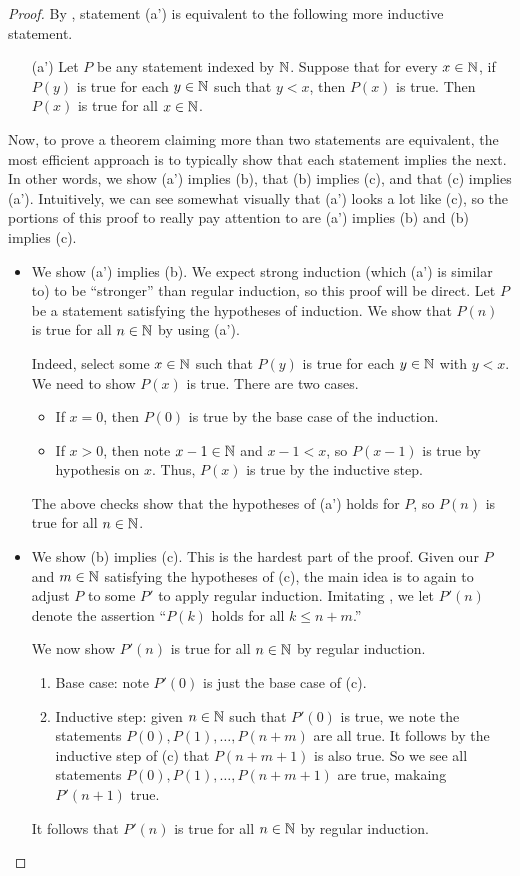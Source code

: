 \documentclass[../notes.tex]{subfiles}
\begin{document}
\begin{proof}
    By , statement (a') is equivalent to the following more inductive statement.
    \begin{itemize}
        \item[(a')] Let $P$ be any statement indexed by $\mathbb N$. Suppose that for every $x \in \mathbb N$, if $P(y)$ is true for each $y \in \mathbb N$ such that $y < x$, then $P(x)$ is true. Then $P(x)$ is true for all $x \in \mathbb N$.
    \end{itemize}
    Now, to prove a theorem claiming more than two statements are equivalent, the most efficient approach is to typically show that each statement implies the next. In other words, we show (a') implies (b), that (b) implies (c), and that (c) implies (a'). Intuitively, we can see somewhat visually that (a') looks a lot like (c), so the portions of this proof to really pay attention to are (a') implies (b) and (b) implies (c).
    \begin{itemize}
        \item We show (a') implies (b). We expect strong induction (which (a') is similar to) to be ``stronger'' than regular induction, so this proof will be direct. Let $P$ be a statement satisfying the hypotheses of induction. We show that $P(n)$ is true for all $n\in\mathbb N$ by using (a').

        Indeed, select some $x\in\mathbb N$ such that $P(y)$ is true for each $y\in\mathbb N$ with $y<x$. We need to show $P(x)$ is true. There are two cases.
        \begin{itemize}
            \item If $x=0$, then $P(0)$ is true by the base case of the induction.
            \item If $x>0$, then note $x-1\in\mathbb N$ and $x-1<x$, so $P(x-1)$ is true by hypothesis on $x$. Thus, $P(x)$ is true by the inductive step.
        \end{itemize}
        The above checks show that the hypotheses of (a') holds for $P$, so $P(n)$ is true for all $n\in\mathbb N$.
        
        \item We show (b) implies (c). This is the hardest part of the proof. Given our $P$ and $m\in\mathbb N$ satisfying the hypotheses of (c), the main idea is to again to adjust $P$ to some $P'$ to apply regular induction. Imitating , we let $P'(n)$ denote the assertion ``$P(k)$ holds for all $k\le n+m$.''

        We now show $P'(n)$ is true for all $n\in\mathbb N$ by regular induction.
        \begin{enumerate}
            \item Base case: note $P'(0)$ is just the base case of (c).
            \item Inductive step: given $n\in\mathbb N$ such that $P'(0)$ is true, we note the statements $P(0),P(1),\ldots,P(n+m)$ are all true. It follows by the inductive step of (c) that $P(n+m+1)$ is also true. So we see all statements $P(0),P(1),\ldots,P(n+m+1)$ are true, makaing $P'(n+1)$ true.
        \end{enumerate}
        It follows that $P'(n)$ is true for all $n\in\mathbb N$ by regular induction.


\end{itemize}
\end{proof}
\end{document}
